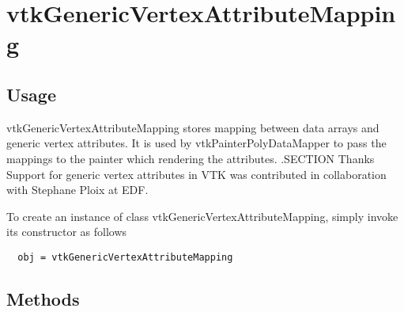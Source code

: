 \section{vtkGenericVertexAttributeMapping}

\subsection{Usage}

 vtkGenericVertexAttributeMapping stores mapping between data arrays and
 generic vertex attributes. It is used by vtkPainterPolyDataMapper to pass the
 mappings to the painter which rendering the attributes.
 .SECTION Thanks
 Support for generic vertex attributes in VTK was contributed in
 collaboration with Stephane Ploix at EDF.

To create an instance of class vtkGenericVertexAttributeMapping, simply
invoke its constructor as follows
\begin{verbatim}
  obj = vtkGenericVertexAttributeMapping
\end{verbatim}
\subsection{Methods}

